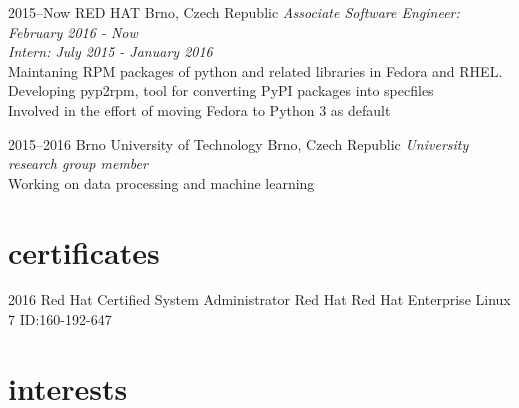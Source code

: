\documentclass[]{friggeri-cv} %
\begin{document}
\begin{entrylist}


\entry
{2015--Now}
{RED HAT}
{Brno, Czech Republic}
{\emph{Associate Software Engineer: February 2016 - Now} \\
\emph{Intern: July 2015 - January 2016} \\
Maintaning RPM packages of python and related libraries
in Fedora and RHEL.
\\Developing pyp2rpm, tool for converting PyPI packages into specfiles
\\Involved in the effort of moving Fedora to Python 3 as default}


\entry
{2015--2016}
{Brno University of Technology}
{Brno, Czech Republic}
{\emph{University research group member} \\ Working on data processing and machine learning}

\end{entrylist}



\section{certificates}

\begin{entrylist}


\entry
{2016}
{Red Hat Certified System Administrator}
{Red Hat}
{Red Hat Enterprise Linux 7 ID:160-192-647}


\end{entrylist}


\section{interests}
\end{document}
